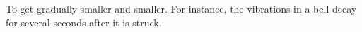 To get gradually smaller and smaller. For instance,
the vibrations in a bell decay for several seconds
after it is struck.